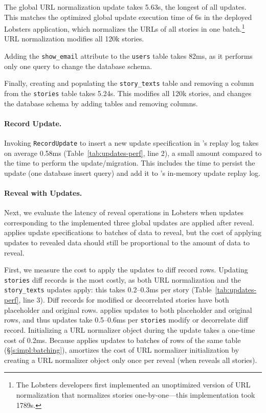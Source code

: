 %
The global URL normalization update takes 5.63s, the longest of all
updates.
%
This matches the optimized global update execution time of 6s in the deployed
Lobsters application, which normalizes the URLs of all stories in one
batch.\footnote{The Lobsters developers first implemented an unoptimized version
of URL normalization that normalizes stories one-by-one---this implementation
took 1789s.}
%
URL normalization modifies all 120k stories.
%

%
Adding the \texttt{show\_email} attribute to the \texttt{users} table takes
82ms, as it performs only one query to change the database schema.
%

%
Finally, creating and populating the \texttt{story\_texts} table and removing a
column from the \texttt{stories} table takes 5.24s.
%
This modifies all 120k stories, and changes the database schema by adding tables
and removing columns.
%

%
\paragraph{Record Update.}
%
Invoking \texttt{RecordUpdate} to insert a new update specification in \sys's
replay log takes on average 0.58ms (Table~\ref{tab:updates-perf}, line 2), a
small amount compared to the time to perform the update/migration. This includes
the time to persist the update (one database insert query) and add it to \sys's
in-memory update replay log.
%

%
\paragraph{Reveal with Updates.}
%
Next, we evaluate the latency of reveal operations in Lobsters when updates
corresponding to the implemented three global updates are applied after reveal.
\sys applies update specifications to batches of data to reveal, but the cost of
applying updates to revealed data should still be proportional to the amount of
data to reveal.

First, we measure the cost to apply the updates to diff record rows.
%
Updating \texttt{stories} diff records is the most costly, as both URL
normalization and the \texttt{story\_texts} updates apply: this takes 0.2--0.3ms
per story (Table~\ref{tab:updates-perf}, line 3).
%
Diff records for modified or decorrelated stories have both placeholder and
original rows. \sys applies updates to both placeholder and original rows, and
thus updates take 0.5--0.6ms per \texttt{stories} modify or decorrelate diff
record.
%
Initializing a URL normalizer object during the update takes a one-time cost of
0.2ms.
%
Because \sys applies updates to batches of rows of the same table
(\S\ref{s:impl:batching}), \sys amortizes the cost of URL normalizer
initialization by creating a URL normalizer object only once per reveal (when
\sys reveals all stories).
%

